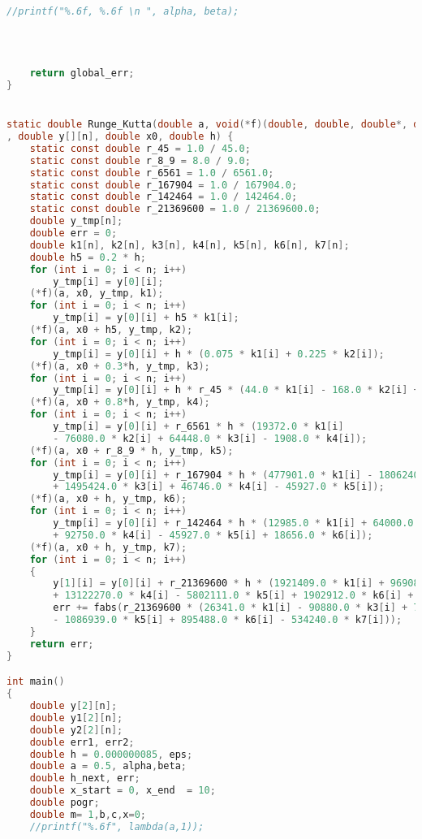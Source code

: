 \documentclass{article}
\theoremstyle{remark}
\theoremstyle{definition}
\begin{document}
\begin{lstlisting}[language=C]
    //printf("%.6f, %.6f \n ", alpha, beta);

    
    
    
    return global_err;
}


static double Runge_Kutta(double a, void(*f)(double, double, double*, double*)
, double y[][n], double x0, double h) {
    static const double r_45 = 1.0 / 45.0;
    static const double r_8_9 = 8.0 / 9.0;
    static const double r_6561 = 1.0 / 6561.0;
    static const double r_167904 = 1.0 / 167904.0;
    static const double r_142464 = 1.0 / 142464.0;
    static const double r_21369600 = 1.0 / 21369600.0;
    double y_tmp[n];
    double err = 0;
    double k1[n], k2[n], k3[n], k4[n], k5[n], k6[n], k7[n];
    double h5 = 0.2 * h;
    for (int i = 0; i < n; i++)
        y_tmp[i] = y[0][i];
    (*f)(a, x0, y_tmp, k1);
    for (int i = 0; i < n; i++)
        y_tmp[i] = y[0][i] + h5 * k1[i];
	(*f)(a, x0 + h5, y_tmp, k2);
    for (int i = 0; i < n; i++)
        y_tmp[i] = y[0][i] + h * (0.075 * k1[i] + 0.225 * k2[i]);
    (*f)(a, x0 + 0.3*h, y_tmp, k3);
    for (int i = 0; i < n; i++)
        y_tmp[i] = y[0][i] + h * r_45 * (44.0 * k1[i] - 168.0 * k2[i] + 160 * k3[i]);
    (*f)(a, x0 + 0.8*h, y_tmp, k4);
    for (int i = 0; i < n; i++)
        y_tmp[i] = y[0][i] + r_6561 * h * (19372.0 * k1[i]
        - 76080.0 * k2[i] + 64448.0 * k3[i] - 1908.0 * k4[i]);
    (*f)(a, x0 + r_8_9 * h, y_tmp, k5);
    for (int i = 0; i < n; i++)
        y_tmp[i] = y[0][i] + r_167904 * h * (477901.0 * k1[i] - 1806240.0 * k2[i]
        + 1495424.0 * k3[i] + 46746.0 * k4[i] - 45927.0 * k5[i]);
    (*f)(a, x0 + h, y_tmp, k6);
    for (int i = 0; i < n; i++)
        y_tmp[i] = y[0][i] + r_142464 * h * (12985.0 * k1[i] + 64000.0 * k3[i]
        + 92750.0 * k4[i] - 45927.0 * k5[i] + 18656.0 * k6[i]);
    (*f)(a, x0 + h, y_tmp, k7);
    for (int i = 0; i < n; i++)
    {
        y[1][i] = y[0][i] + r_21369600 * h * (1921409.0 * k1[i] + 9690880.0 * k3[i]
        + 13122270.0 * k4[i] - 5802111.0 * k5[i] + 1902912.0 * k6[i] + 534240.0 * k7[i]);
        err += fabs(r_21369600 * (26341.0 * k1[i] - 90880.0 * k3[i] + 790230.0 * k4[i]
        - 1086939.0 * k5[i] + 895488.0 * k6[i] - 534240.0 * k7[i]));
    }
    return err;
}

int main()
{
    double y[2][n];
    double y1[2][n];
	double y2[2][n];
	double err1, err2;
    double h = 0.000000085, eps;
    double a = 0.5, alpha,beta;
    double h_next, err;
    double x_start = 0, x_end  = 10;
    double pogr;
    double m= 1,b,c,x=0;
    //printf("%.6f", lambda(a,1));
    

\end{lstlisting}
\end{document}
